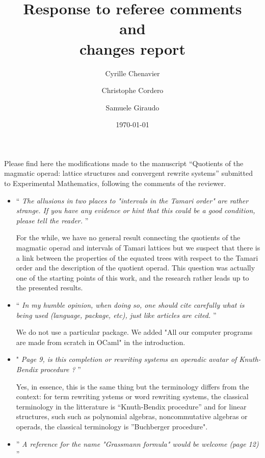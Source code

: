 \documentclass[10pt,reqno]{amsart}
\title[Response to Referees]
    {Response to referee comments \\
    and \\
    changes report}
\date{\today}
\author{Cyrille Chenavier \and Christophe Cordero \and Samuele Giraudo}
\numberwithin{equation}{subsection}
\begin{document}
\maketitle

Please find here the modifications made to the manuscript
``Quotients of the magmatic operad: lattice structures and convergent
rewrite systems'' submitted to Experimental Mathematics, following
the comments of the reviewer.
\bigbreak

\begin{itemize}

\item `` {\it
The allusions in two places to "intervals in the Tamari order" are
rather strange. If you have any evidence or hint that this could be a
good condition, please tell the reader.
}''
\smallbreak

For the while, we have no general result connecting the quotients of
the magmatic operad and intervals of Tamari lattices but we suspect
that there is a link between the properties of the equated trees
with respect to the Tamari order and the description of the quotient
operad. This question was actually one of the starting points of this
work, and the research rather leads up to the presented results.
\medbreak

\item `` {\it
In my humble opinion, when doing so, one should cite carefully what 
is being used (language, package, etc), just like articles are cited.
}''
\smallbreak

We do not use a particular package. We added 
"All our computer programs are made from scratch in OCaml" in the 
introduction. 
\medbreak

\item "{\it
  Page 9, is this completion or rewriting systems an operadic avatar of
  Knuth-Bendix procedure ?
}''
  \smallbreak

 Yes, in essence, this is the same thing but the terminology differs from
 the context: for term rewriting ystems or word rewriting systems, the
 classical terminology in the litterature is ``Knuth-Bendix procedure''
 and for linear structures, such  such as polynomial algebras,
 noncommutative algebras or operads, the classical terminology is
 ''Buchberger procedure".
 \medbreak

\item ''{\it
  A reference for the name "Grassmann formula" would be welcome (page 12)
}''
  \smallbreak


\end{itemize}
\end{document}
